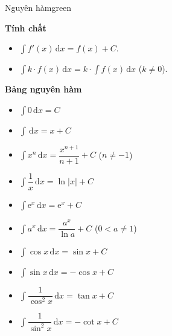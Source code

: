 \documentclass[12pt,a4paper,landscape]{book}
\begin{document}
	\pagestyle{fancy}
	\lhead{\fancyplain{}{\rightmark}}
	\chead{}
	\cfoot{\thepage}
	\renewcommand{\headrulewidth}{0.4pt}
	\renewcommand{\footrulewidth}{0.4pt}
	\begin{multicols*}{3}
		\begin{khung_trello}{Nguyên hàm}{green}
			\begin{khung_trello_box}
				\textbf{\color{trello_bg_green}Tính chất}
				\begin{itemize}[leftmargin=5mm]
					\item $\displaystyle\int f'(x)\mathrm{\,d}x=f(x)+C$.
					\item $\displaystyle\int k\cdot f(x)\mathrm{\,d}x=k\cdot\displaystyle\int f(x)\mathrm{\,d}x$ ($k\neq0$).
				\end{itemize}
			\end{khung_trello_box}
			\begin{khung_trello_box}
				\textbf{\color{trello_bg_green}Bảng nguyên hàm}
				\begin{itemize}[leftmargin=5mm]
					\item $\displaystyle\int0\mathrm{\,d}x=C$
					\item $\displaystyle\int\mathrm{\,d}x=x+C$
					\item $\displaystyle\int x^n\mathrm{\,d}x=\dfrac{x^{n+1}}{n+1}+C$ ($n\neq-1$)
					\item $\displaystyle\int\dfrac{1}{x}\mathrm{\,d}x=\ln|x|+C$
					\item $\displaystyle\int\mathrm{e}^x\mathrm{\,d}x=\mathrm{e}^x+C$
					\item $\displaystyle\int a^x\mathrm{\,d}x=\dfrac{a^x}{\ln a}+C$ ($0<a\neq1$)
					\item $\displaystyle\int\cos x\mathrm{\,d}x=\sin x+C$
					\item $\displaystyle\int\sin x\mathrm{\,d}x=-\cos x+C$
					\item $\displaystyle\int\dfrac{1}{\cos^2x}\mathrm{\,d}x=\tan x+C$
					\item $\displaystyle\int\dfrac{1}{\sin^2x}\mathrm{\,d}x=-\cot x+C$
				\end{itemize}

\end{khung_trello_box}
\end{khung_trello}
\end{multicols*}
\end{document}

